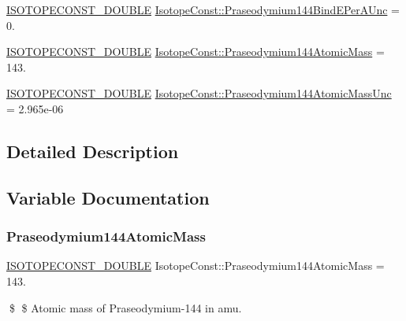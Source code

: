 \begin{DoxyCompactItemize}
\item 
\mbox{\hyperlink{group___isotope_const-_macros_ga8f45a7272ce02c0b4c65c44636ed719a}{I\+S\+O\+T\+O\+P\+E\+C\+O\+N\+S\+T\+\_\+\+D\+O\+U\+B\+LE}} \mbox{\hyperlink{group___isotope_const-_praseodymium-_pr144_ga6665f32df8efb40add788643c4033458}{Isotope\+Const\+::\+Praseodymium144\+Bind\+E\+Per\+A\+Unc}} = 0.
\item 
\mbox{\hyperlink{group___isotope_const-_macros_ga8f45a7272ce02c0b4c65c44636ed719a}{I\+S\+O\+T\+O\+P\+E\+C\+O\+N\+S\+T\+\_\+\+D\+O\+U\+B\+LE}} \mbox{\hyperlink{group___isotope_const-_praseodymium-_pr144_ga5b997d3da832d0816633335a079e864b}{Isotope\+Const\+::\+Praseodymium144\+Atomic\+Mass}} = 143.
\item 
\mbox{\hyperlink{group___isotope_const-_macros_ga8f45a7272ce02c0b4c65c44636ed719a}{I\+S\+O\+T\+O\+P\+E\+C\+O\+N\+S\+T\+\_\+\+D\+O\+U\+B\+LE}} \mbox{\hyperlink{group___isotope_const-_praseodymium-_pr144_ga6c526a767a02d9d3680a71aa7dffef60}{Isotope\+Const\+::\+Praseodymium144\+Atomic\+Mass\+Unc}} = 2.\+965e-\/06
\end{DoxyCompactItemize}


\subsection{Detailed Description}


\subsection{Variable Documentation}
\mbox{\label{group___isotope_const-_praseodymium-_pr144_ga5b997d3da832d0816633335a079e864b}} 
\subsubsection{\texorpdfstring{Praseodymium144\+Atomic\+Mass}{Praseodymium144AtomicMass}}
{\footnotesize\ttfamily \mbox{\hyperlink{group___isotope_const-_macros_ga8f45a7272ce02c0b4c65c44636ed719a}{I\+S\+O\+T\+O\+P\+E\+C\+O\+N\+S\+T\+\_\+\+D\+O\+U\+B\+LE}} Isotope\+Const\+::\+Praseodymium144\+Atomic\+Mass = 143.}

\$ \$ Atomic mass of Praseodymium-\/144 in amu. \mbox{\label{group___isotope_const-_praseodymium-_pr144_ga6c526a767a02d9d3680a71aa7dffef60}} 
